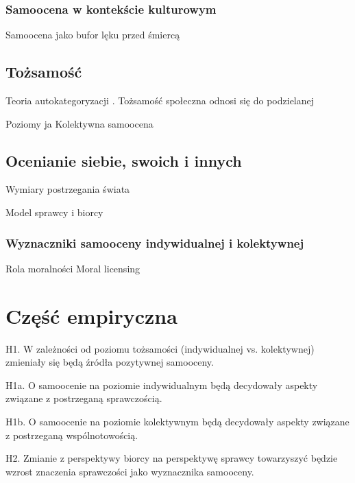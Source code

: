 \documentclass[man]{apa6}
\begin{document}
\subsubsection{Samoocena w kontekście kulturowym}

Samoocena jako bufor lęku przed śmiercą \parencite{pyszczynski2004people}
\newpage
\subsection{Tożsamość}

Teoria autokategoryzacji \parencite{turner1994self}.
Tożsamość społeczna odnosi się do podzielanej 

Poziomy ja \parencite{brewer2007importance}
Kolektywna samoocena \parencite{crocker1990collective}
\newpage
\subsection{Ocenianie siebie, swoich i innych}
Wymiary postrzegania świata \parencite {abele2007agency}

Model sprawcy i biorcy \parencite{wojciszke2011self}
\newpage
\subsubsection{Wyznaczniki samooceny indywidualnej i kolektywnej}

Rola moralności \parencite{ellemers2008better, ellemers2012morality, leach2007group, pagliaro2011sharing}
Moral licensing \parencite{merritt2010moral, monin2001moral}
\newpage
\section{Część empiryczna}

\begin{APAitemize}
\item H1.  W zależności od poziomu tożsamości (indywidualnej vs. kolektywnej) zmieniały się będą źródła pozytywnej samooceny.
\item H1a. O samoocenie na poziomie indywidualnym będą decydowały aspekty związane z postrzeganą sprawczością.
\item H1b. O samoocenie na poziomie kolektywnym będą decydowały aspekty związane z postrzeganą wspólnotowością.
\item H2.  Zmianie z perspektywy biorcy na perspektywę sprawcy towarzyszyć będzie wzrost znaczenia sprawczości jako wyznacznika samooceny.
\end{APAitemize}
\end{document}
